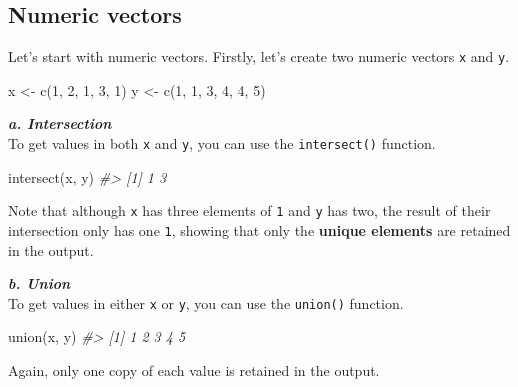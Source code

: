 \documentclass[
]{book}
\newenvironment{Shaded}{\begin{snugshade}}{\end{snugshade}}
\newcommand{\CommentTok}[1]{\textcolor[rgb]{0.56,0.35,0.01}{\textit{#1}}}
\newcommand{\DecValTok}[1]{\textcolor[rgb]{0.00,0.00,0.81}{#1}}
\newcommand{\FunctionTok}[1]{\textcolor[rgb]{0.00,0.00,0.00}{#1}}
\newcommand{\NormalTok}[1]{#1}
\newcommand{\OtherTok}[1]{\textcolor[rgb]{0.56,0.35,0.01}{#1}}
\begin{document}
\hypertarget{operations}{%
\subsection{Numeric vectors}\label{operations}}

Let's start with numeric vectors. Firstly, let's create two numeric vectors \texttt{x} and \texttt{y}.

\begin{Shaded}
\begin{Highlighting}[]
\NormalTok{x }\OtherTok{\textless{}{-}} \FunctionTok{c}\NormalTok{(}\DecValTok{1}\NormalTok{, }\DecValTok{2}\NormalTok{, }\DecValTok{1}\NormalTok{, }\DecValTok{3}\NormalTok{, }\DecValTok{1}\NormalTok{)}
\NormalTok{y }\OtherTok{\textless{}{-}} \FunctionTok{c}\NormalTok{(}\DecValTok{1}\NormalTok{, }\DecValTok{1}\NormalTok{, }\DecValTok{3}\NormalTok{, }\DecValTok{4}\NormalTok{, }\DecValTok{4}\NormalTok{, }\DecValTok{5}\NormalTok{)}
\end{Highlighting}
\end{Shaded}

\textbf{\emph{a. Intersection}}\\
To get values in both \texttt{x} and \texttt{y}, you can use the \texttt{intersect()} function.

\begin{Shaded}
\begin{Highlighting}[]
\FunctionTok{intersect}\NormalTok{(x, y)}
\CommentTok{\#\textgreater{} [1] 1 3}
\end{Highlighting}
\end{Shaded}

Note that although \texttt{x} has three elements of \texttt{1} and \texttt{y} has two, the result of their intersection only has one \texttt{1}, showing that only the \textbf{unique elements} are retained in the output.

\textbf{\emph{b. Union}}\\
To get values in either \texttt{x} or \texttt{y}, you can use the \texttt{union()} function.

\begin{Shaded}
\begin{Highlighting}[]
\FunctionTok{union}\NormalTok{(x, y)}
\CommentTok{\#\textgreater{} [1] 1 2 3 4 5}
\end{Highlighting}
\end{Shaded}

Again, only one copy of each value is retained in the output.
\end{document}
